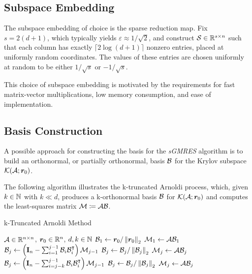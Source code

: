 \subsection{Subspace Embedding} \label{sseq:embdedding}

The subspace embedding of choice is the sparse reduction map. Fix $s = 2 \left( d + 1 \right)$, which typically yields $\varepsilon \approx 1 / \sqrt{2}$, and construct $\mathcal{S} \in \mathbb{R}^{s \times n}$ such that each column has exactly $\lceil 2 \log \left( d + 1 \right) \rceil$ nonzero entries, placed at uniformly random coordinates. The values of these entries are chosen uniformly at random to be either $1 / \sqrt{s}$ or $-1 / \sqrt{s}$.

This choice of subspace embedding is motivated by the requirements for fast matrix-vector multiplications, low memory consumption, and ease of implementation.

\subsection{Basis Construction} \label{sseq:basis}

A possible approach for constructing the basis for the \textit{sGMRES} algorithm is to build an orthonormal, or partially orthonormal, basis $\mathcal{B}$ for the Krylov subspace $\mathcal{K}(\mathcal{A}; \bm{r}_0)$.

The following algorithm illustrates the k-truncated Arnoldi process, which, given $k \in \mathbb{N}$ with $k \ll d$, produces a k-orthonormal basis $\mathcal{B}$ for $\mathcal{K}(\mathcal{A}; \bm{r}_0)$ and computes the least-squares matrix $\mathcal{M} \coloneqq \mathcal{A} \mathcal{B}$.

\begin{algorithm}
\caption{k-Truncated Arnoldi Method} \label{alg:arnoldi}
\begin{algorithmic}
\Require $\mathcal{A} \in \mathbb{R}^{n \times n}$, $\bm{r}_0 \in \mathbb{R}^{n}$, $d, k \in \mathbb{N}$
\State $\mathcal{B}_1 \gets \bm{r}_0 / \left\lVert \bm{r}_0 \right\rVert_2$
\State $\mathcal{M}_1 \gets \mathcal{A} \mathcal{B}_1$
    \State $\mathcal{B}_j \gets \left( \mathbf{I}_n - \sum_{i=1}^{j-1} \mathcal{B}_i \mathcal{B}_i^{\intercal} \right) \mathcal{M}_{j-1}$
    \State $\mathcal{B}_j \gets \mathcal{B}_j / \left\lVert \mathcal{B}_j \right\rVert_2$
    \State $\mathcal{M}_j \gets \mathcal{A} \mathcal{B}_j$
\EndFor
{}
    \State $\mathcal{B}_j \gets \left( \mathbf{I}_n - \sum_{i=j-k}^{j-1} \mathcal{B}_i \mathcal{B}_i^{\intercal} \right) \mathcal{M}_{j-1}$
    \State $\mathcal{B}_j \gets \mathcal{B}_j / \left\lVert \mathcal{B}_j \right\rVert_2$
    \State $\mathcal{M}_j \gets \mathcal{A} \mathcal{B}_j$
\EndFor
\end{algorithmic}
\end{algorithm}

